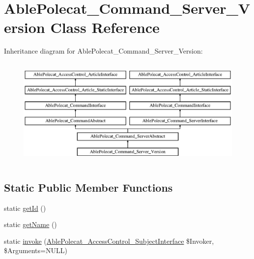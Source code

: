 \hypertarget{class_able_polecat___command___server___version}{}\section{Able\+Polecat\+\_\+\+Command\+\_\+\+Server\+\_\+\+Version Class Reference}
\label{class_able_polecat___command___server___version}
Inheritance diagram for Able\+Polecat\+\_\+\+Command\+\_\+\+Server\+\_\+\+Version\+:\begin{figure}[H]
\begin{center}
\leavevmode
\includegraphics[height=5.419355cm]{class_able_polecat___command___server___version}
\end{center}
\end{figure}
\subsection*{Static Public Member Functions}
\begin{DoxyCompactItemize}
\item 
static \hyperlink{class_able_polecat___command___server___version_acfaa3a96d0cb5a4c0d4d710dcba41e9e}{get\+Id} ()
\item 
static \hyperlink{class_able_polecat___command___server___version_a4ef9bd37ba3ce8a13c1e8bcf4f72a630}{get\+Name} ()
\item 
static \hyperlink{class_able_polecat___command___server___version_a6821480fe527af0afdf3691d7cffad5f}{invoke} (\hyperlink{interface_able_polecat___access_control___subject_interface}{Able\+Polecat\+\_\+\+Access\+Control\+\_\+\+Subject\+Interface} \$Invoker, \$Arguments=N\+U\+L\+L)
\end{DoxyCompactItemize}
